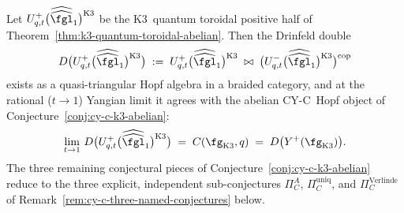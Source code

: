 
\begin{corollary}
\label{cor:cy-c-abelian-from-toroidal-positive-half}
\ClaimStatusProvedHere
Let $U^+_{q,t}\bigl(\widehat{\widehat{\fgl}}_1\bigr)^{\mathrm{K}3}$ be
the K$3$~quantum toroidal positive half of
Theorem~\ref{thm:k3-quantum-toroidal-abelian}.  Then the Drinfeld double
\begin{equation}\label{eq:cy-c-from-toroidal-double}
  D\bigl(U^+_{q,t}\bigl(\widehat{\widehat{\fgl}}_1\bigr)^{\mathrm{K}3}\bigr)
  \;:=\;
  U^+_{q,t}\bigl(\widehat{\widehat{\fgl}}_1\bigr)^{\mathrm{K}3}
  \;\bowtie\;
  \bigl(U^-_{q,t}\bigl(\widehat{\widehat{\fgl}}_1\bigr)^{\mathrm{K}3}\bigr)^{\mathrm{cop}}
\end{equation}
exists as a quasi-triangular Hopf algebra in a braided category, and at
the rational ($t \to 1$) Yangian limit it agrees with the abelian
CY-C~Hopf object of Conjecture~\ref{conj:cy-c-k3-abelian}:
\begin{equation}\label{eq:cy-c-equality-from-toroidal}
  \lim_{t \to 1}\, D\bigl(U^+_{q,t}\bigl(\widehat{\widehat{\fgl}}_1\bigr)^{\mathrm{K}3}\bigr)
  \;=\;
  C(\fg_{\mathrm{K}3}, q)
  \;=\;
  D\bigl(Y^+(\fg_{\mathrm{K}3})\bigr).
\end{equation}
The three remaining conjectural pieces of Conjecture~\ref{conj:cy-c-k3-abelian}
reduce to the three explicit, independent sub-conjectures
$\Pi_C^A$, $\Pi_C^{\mathrm{uniq}}$, and $\Pi_C^{\mathrm{Verlinde}}$ of
Remark~\ref{rem:cy-c-three-named-conjectures} below.
\end{corollary}

